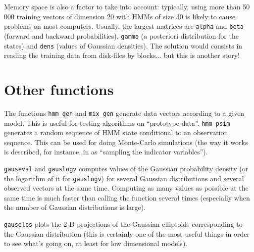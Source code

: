 \documentclass[a4paper,11pt]{article}
\begin{document}
Memory space is also a factor to take into account: typically, using more than 50 000 training vectors of dimension 20 with HMMs of size 30 is likely to cause problems on most computers. Usually, the largest matrices are \verb:alpha: and \verb:beta: (forward and backward probabilities), \verb:gamma: (a posteriori distribution for the states) and \verb:dens: (values of Gaussian densities). The solution would consists in reading the training data from disk-files by blocks... but this is another story! 

\section{Other functions}
The functions \verb+hmm_gen+ and \verb+mix_gen+ generate data vectors according to a given model. This is useful for testing algorithms on ``prototype data''. \verb+hmm_psim+ generates a random sequence of HMM state conditional to an observation sequence. This can be used for doing Monte-Carlo simulations (the way it works is described, for instance, in \cite{Carter:GibbsState} as ``sampling the indicator variables'').

\verb+gauseval+ and \verb+gauslogv+ computes values of the Gaussian probability density (or the logarithm of it for \verb+gauslogv+) for several Gaussian distributions and several observed vectors at the same time. Computing as many values as possible at the same time is much faster than calling the function several times (especially when the number of Gaussian distributions is large).

\verb+gauselps+ plots the 2-D projections of the Gaussian ellipsoids corresponding to the Gaussian distribution (this is certainly one of the most useful things in order to see what's going on, at least for low dimensional models).
\end{document}
